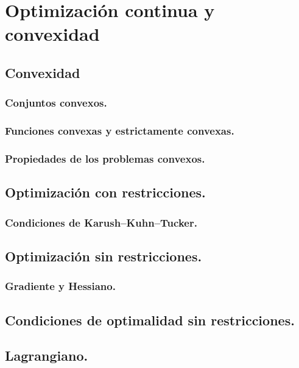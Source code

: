\section{Optimización continua y convexidad}

\subsection{Convexidad}

\subsubsection{Conjuntos convexos.}

\subsubsection{Funciones convexas y estrictamente convexas.}

\subsubsection{Propiedades de los problemas convexos.}

\subsection{Optimización con restricciones.}

\subsubsection{Condiciones de Karush–Kuhn–Tucker.}

\subsection{Optimización sin restricciones.}

\subsubsection{Gradiente y Hessiano.}

\subsection{Condiciones de optimalidad sin restricciones.}

\subsection{Lagrangiano.}

